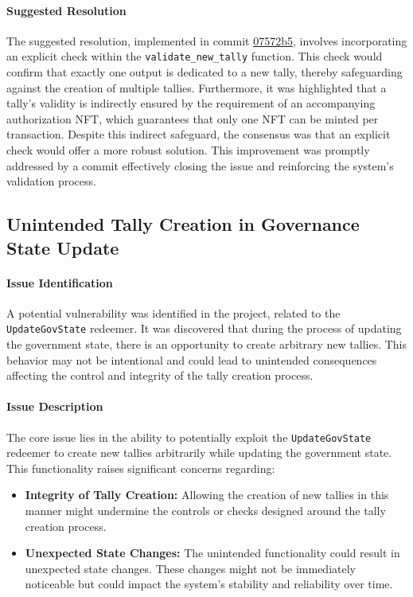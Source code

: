 \documentclass[11pt]{article}
\begin{document}
\paragraph{Suggested Resolution}
The suggested resolution, implemented in commit \href{https://github.com/MuesliSwapTeam/muesliswap-atala-onchain-governance/commit/07572b5b699092fbff2aa0fb61fc14183e89179d}{07572b5}, involves incorporating an explicit check within the \texttt{validate\_new\_tally} function.
This check would confirm that exactly one output is dedicated to a new tally, thereby safeguarding against the creation of multiple tallies.
Furthermore, it was highlighted that a tally's validity is indirectly ensured by the requirement of an accompanying authorization NFT, which guarantees that only one NFT can be minted per transaction.
Despite this indirect safeguard, the consensus was that an explicit check would offer a more robust solution.
This improvement was promptly addressed by a commit effectively closing the issue and reinforcing the system's validation process.

\subsection{Unintended Tally Creation in Governance State Update}

\paragraph{Issue Identification}
A potential vulnerability was identified in the project, related to the \texttt{UpdateGovState} redeemer.
It was discovered that during the process of updating the government state, there is an opportunity to create arbitrary new tallies.
This behavior may not be intentional and could lead to unintended consequences affecting the control and integrity of the tally creation process.

\paragraph{Issue Description}
The core issue lies in the ability to potentially exploit the \texttt{UpdateGovState} redeemer to create new tallies arbitrarily while updating the government state.
This functionality raises significant concerns regarding:
\begin{itemize}
    \item \textbf{Integrity of Tally Creation:} Allowing the creation of new tallies in this manner might undermine the controls or checks designed around the tally creation process.
    \item \textbf{Unexpected State Changes:} The unintended functionality could result in unexpected state changes. These changes might not be immediately noticeable but could impact the system's stability and reliability over time.
\end{itemize}
\end{document}

